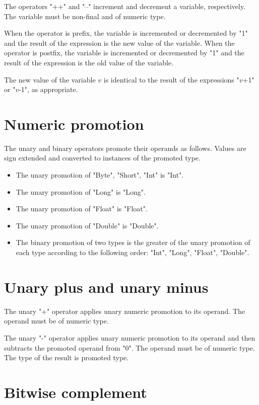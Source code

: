 The operators \xcd"++" and \xcd"--" increment and decrement
a variable, respectively.  The variable must be non-final
and of numeric type.

When the operator is prefix, the variable is
incremented or decremented by \xcd"1" and the result of the expression is
the new value of the variable.
When the operator is postfix, the variable is incremented or
decremented by \xcd"1" and the result of the expression is the old value of
the variable.

The new value of the variable $v$ is identical to the result of
the expressions
\xcdmath"$v$+1" or \xcdmath"$v$-1", as appropriate.

\section{Numeric promotion}
\label{XtenPromotions}

The unary and binary operators promote their operands as
follows.
Values are sign extended and converted to instances of the
promoted type.

\begin{itemize}
\item  The unary promotion of \xcd"Byte", \xcd"Short",
\xcd"Int" is \xcd"Int".
\item  The unary promotion of \xcd"Long" is \xcd"Long".
\item  The unary promotion of \xcd"Float" is \xcd"Float".
\item  The unary promotion of \xcd"Double" is \xcd"Double".
\item The binary promotion of two types is the  
greater of the unary promotion of each type
according to the following order:
\xcd"Int", \xcd"Long", \xcd"Float", \xcd"Double".
\end{itemize}

\section{Unary plus and unary minus}

The unary \xcd"+" operator applies unary numeric promotion to
its operand.   The operand must be of numeric type.

The unary \xcd"-" operator
applies unary numeric promotion to its operand
and then
subtracts the promoted operand from \xcd"0".
The operand must be of numeric type.
The type of the result is promoted type.

\section{Bitwise complement}

